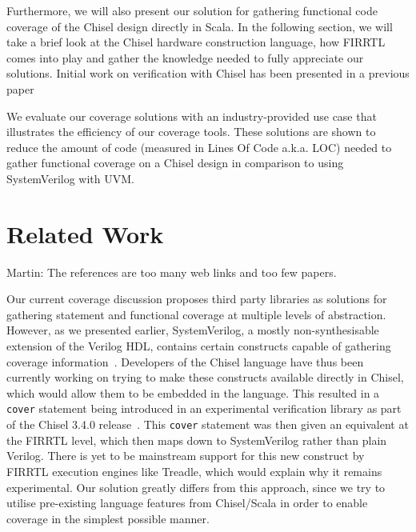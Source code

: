 \documentclass[conference]{IEEEtran}
\newcommand{\martin}[1]{{\color{blue} Martin: #1}}
\begin{document}
Furthermore, we will also present our solution for gathering functional code coverage of the Chisel design directly in Scala. In the following section, we will take a brief look at the Chisel hardware construction language, how FIRRTL comes into play and gather the knowledge needed to fully appreciate our solutions. Initial work on verification with Chisel has been presented in a previous paper~\cite{blind} %

We evaluate our coverage solutions with an industry-provided use case that illustrates the efficiency of our coverage tools. These solutions are shown to reduce the amount of code (measured in Lines Of Code a.k.a. LOC) needed to gather functional coverage on a Chisel design in comparison to using SystemVerilog with UVM.

\section{Related Work}

\martin{The references are too many web links and too few papers.}

Our current coverage discussion proposes third party libraries  as solutions for gathering statement and functional coverage at multiple levels of abstraction. However, as we presented earlier, SystemVerilog, a mostly non-synthesisable extension of the Verilog HDL, contains certain constructs capable of gathering coverage information~\cite{spear2008systemverilog}. Developers of the Chisel language have thus been currently working on trying to make these constructs available directly in Chisel, which would allow them to be embedded in the language. This resulted in a \texttt{cover} statement being introduced in an experimental verification library as part of the Chisel 3.4.0 release~\cite{chisel3.4release_notes}. This \texttt{cover} statement was then given an equivalent at the FIRRTL level, which then maps down to SystemVerilog rather than plain Verilog. There is yet to be mainstream support for this new construct by FIRRTL execution engines like Treadle, which would explain why it remains experimental. Our solution greatly differs from this approach, since we try to utilise pre-existing language features from Chisel/Scala in order to enable coverage in the simplest possible manner. 
\end{document}
